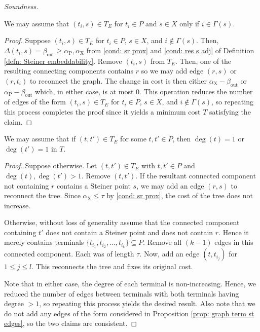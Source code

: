 \documentclass{article}\providecommand{\DeclareRedundantLanguages}[2]{}\usepackage[a4paper,margin=20mm]{geometry}
\newcommand{\1}{\textbf{1}}
\newcommand{\td}{\tau}
\newcommand{\srd}{\alpha_{\text{X}}}
\newcommand{\trd}{\alpha_{\text{P}}}
\begin{document}
\begin{paragraph}{\textit{Soundness.}}
 \begin{proposition} \label{prop: graph term st edges}
 We may assume that $(t_i, s) \in T_E$ for $t_i \in P$ and $s \in X$ only if $i \in \Gamma(s)$.
 \end{proposition}
 \begin{proof}
  Suppose $(t_i,s) \in T_E$ for $t_i \in P$, $s \in X$, and $i \not\in \Gamma(s)$. Then, $\Delta(t_i,s) = \beta_{\text{out}} \geq \trd, \srd$ from \ref{cond: sr prox} and \ref{cond: res s adj} of Definition \ref{defn: Steiner embeddability}. Remove $(t_i,s)$ from $T_E$. Then, one of the resulting connecting components contains $r$ so we may add edge $(r,s)$ or $(r, t_i)$ to reconnect the graph. The change in cost is then either $\srd - \beta_{\text{out}}$ or $\trd - \beta_{\text{out}}$ which, in either case, is at most $0$. This operation reduces the number of edges of the form $(t_i,s) \in T_E$ for $t_i \in P$, $s \in X$, and $i \not\in \Gamma(s)$, so repeating this process completes the proof since it yields a minimum cost $T$ satisfying the claim.
 \end{proof}
 
 
  \begin{lemma} \label{lem: graph deg condition term}
 We may assume that if $(t, t') \in T_E$  for some $t, t' \in P$, then $\deg(t) = 1$ or $\deg(t') = 1$ in $T$.
 \end{lemma}
 \begin{proof}
 Suppose otherwise. Let $(t,t') \in T_E$ with $t,t' \in P$ and $\deg(t), \deg(t') > 1$. Remove $(t,t')$. If the resultant connected component not containing $r$ contains a Steiner point $s$, we may add an edge $(r,s)$ to reconnect the tree. Since $\srd \leq \td$ by \ref{cond: sr prox}, the cost of the tree does not increase.
 
 Otherwise, without loss of generality assume that the connected component containing $t'$ does not contain a Steiner point and does not contain $r$. Hence it merely contains terminals $\{t_{i_1}, t_{i_2}, \ldots, t_{i_k}\} \subseteq P$. Remove all $(k-1)$ edges in this connected component. Each was of length $\td$. Now, add an edge $(t, t_{i_j})$ for $1 \leq j \leq l$. This reconnects the tree and fixes its original cost. 
 
 Note that in either case, the degree of each terminal is non-increasing. Hence, we reduced the number of edges between terminals with both terminals having degree $> 1$, so repeating this process yields the desired result. Also note that we do not add any edges of the form considered in Proposition \ref{prop: graph term st edges}, so the two claims are consistent.
 \end{proof}
 

\end{paragraph}
\end{document}
